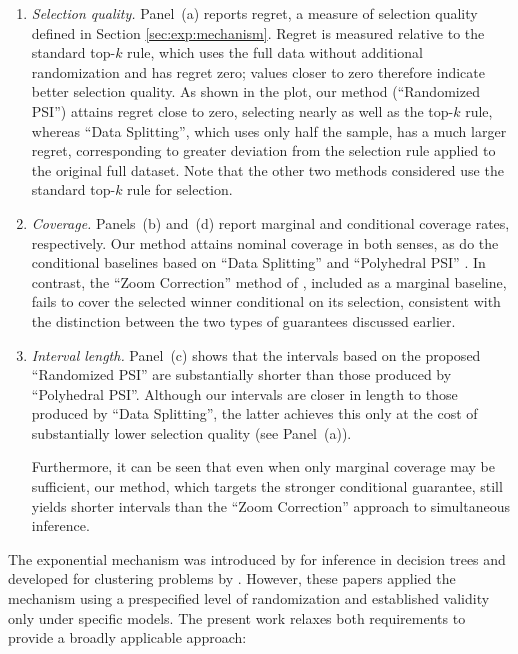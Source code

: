 \documentclass[12pt]{article}
\begin{document}
\begin{enumerate}[leftmargin=*]
\item \emph{Selection quality.} 
Panel~(a) reports regret, a measure of selection quality defined in Section \ref{sec:exp:mechanism}. 
Regret is measured relative to the standard top-$k$ rule, which uses the full data without additional randomization and has regret zero; values closer to zero therefore indicate better selection quality.
As shown in the plot, our method (``Randomized PSI'') attains regret close to zero, selecting nearly as well as the top-$k$ rule, whereas ``Data Splitting'', which uses only half the sample, has a much larger regret, corresponding to greater deviation from the selection rule applied to the original full dataset.
Note that the other two methods considered use the standard top-$k$ rule for selection.

\item \emph{Coverage.}
Panels~(b) and~(d) report marginal and conditional coverage rates, respectively. 
Our method attains nominal coverage in both senses, as do the conditional baselines based on ``Data Splitting'' and ``Polyhedral PSI'' \citep{reid2017post}. 
In contrast, the ``Zoom Correction'' method of \cite{zrnic2025flexible}, included as a marginal baseline, fails to cover the selected winner conditional on its selection, consistent with the distinction between the two types of guarantees discussed earlier.

\item \emph{Interval length.} Panel~(c) shows that the intervals based on the proposed ``Randomized PSI'' are substantially shorter than those produced by ``Polyhedral PSI''. 
Although our intervals are closer in length to those produced by ``Data Splitting'', the latter achieves this only at the cost of substantially lower selection quality (see Panel~(a)).

Furthermore, it can be seen that even when only marginal coverage may be sufficient, our method, which targets the stronger conditional guarantee, still yields shorter intervals than the ``Zoom Correction'' approach to simultaneous inference.
\end{enumerate} 


The exponential mechanism was introduced by \citet{bakshi2025classification} for inference in decision trees and developed for clustering problems by \citet{wu2025hierarchical}.
However, these papers applied the mechanism using a prespecified level of randomization and established validity only under specific models.
The present work relaxes both requirements to provide a broadly applicable approach:
\end{document}

